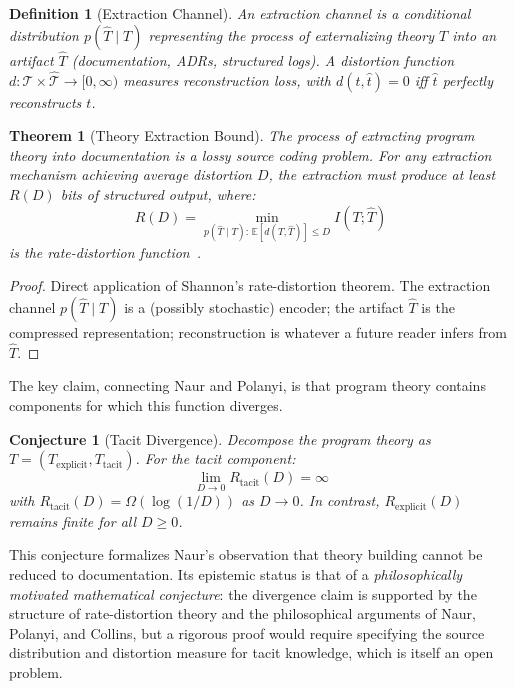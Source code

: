 \documentclass[11pt, a4paper, copyright]{googledeepmind}
\newtheorem{definition}{Definition}[section]
\newtheorem{theorem}{Theorem}[section]
\newtheorem{conjecture}{Conjecture}[section]
\begin{document}
\begin{definition}[Extraction Channel]
An \emph{extraction channel} is a conditional distribution $p(\hat{T} \mid T)$ representing the process of externalizing theory $T$ into an artifact $\hat{T}$ (documentation, ADRs, structured logs). A \emph{distortion function} $d: \mathcal{T} \times \hat{\mathcal{T}} \to [0, \infty)$ measures reconstruction loss, with $d(t, \hat{t}) = 0$ iff $\hat{t}$ perfectly reconstructs $t$.
\end{definition}

\begin{theorem}[Theory Extraction Bound]
\label{thm:extraction}
The process of extracting program theory into documentation is a lossy source coding problem. For any extraction mechanism achieving average distortion $D$, the extraction must produce at least $R(D)$ bits of structured output, where:
\begin{equation}
    R(D) = \min_{p(\hat{T} \mid T): \, \mathbb{E}[d(T, \hat{T})] \leq D} I(T; \hat{T})
\end{equation}
is the rate-distortion function~\citep{shannon1959, cover2006}.
\end{theorem}

\begin{proof}
Direct application of Shannon's rate-distortion theorem. The extraction channel $p(\hat{T} \mid T)$ is a (possibly stochastic) encoder; the artifact $\hat{T}$ is the compressed representation; reconstruction is whatever a future reader infers from $\hat{T}$.
\end{proof}

The key claim, connecting Naur and Polanyi, is that program theory contains components for which this function diverges.

\begin{conjecture}[Tacit Divergence]
\label{conj:tacit}
Decompose the program theory as $T = (T_{\mathrm{explicit}}, T_{\mathrm{tacit}})$. For the tacit component:
\begin{equation}
    \lim_{D \to 0} R_{\mathrm{tacit}}(D) = \infty
\end{equation}
with $R_{\mathrm{tacit}}(D) = \Omega(\log(1/D))$ as $D \to 0$. In contrast, $R_{\mathrm{explicit}}(D)$ remains finite for all $D \geq 0$.
\end{conjecture}

This conjecture formalizes Naur's observation that theory building cannot be reduced to documentation. Its epistemic status is that of a \emph{philosophically motivated mathematical conjecture}: the divergence claim is supported by the structure of rate-distortion theory and the philosophical arguments of Naur, Polanyi, and Collins, but a rigorous proof would require specifying the source distribution and distortion measure for tacit knowledge, which is itself an open problem.
\end{document}

